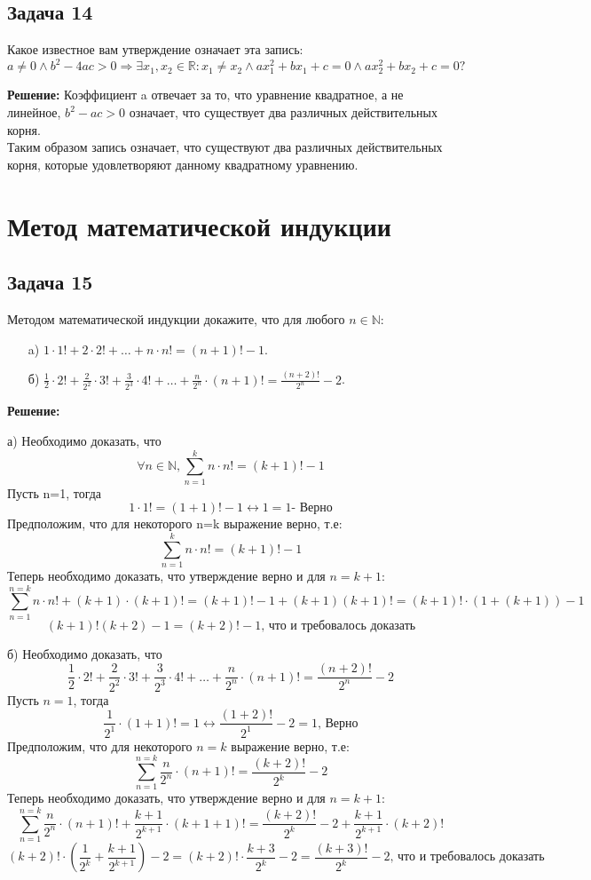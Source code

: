 \documentclass[a4paper,12pt]{article}
\begin{document}
\subsection{Задача 14}
Какое известное вам утверждение означает эта запись:
\[
a \neq 0 \wedge b^2 - 4ac > 0 \Rightarrow \exists x_1, x_2 \in \mathbb{R} : x_1 \neq x_2 \wedge ax_1^2 + bx_1 + c = 0 \wedge ax_2^2 + bx_2 + c = 0?
\]

\textbf{Решение:}
Коэффициент a отвечает за то, что уравнение квадратное, а не линейное, $b^2-ac>0$ означает, что существует два различных действительных корня.\\
Таким образом запись означает, что существуют два различных действительных корня, которые удовлетворяют данному квадратному уравнению.
\vspace{1cm}

\section{Метод математической индукции}

\subsection{Задача 15}
Методом математической индукции докажите, что для любого \(n \in \mathbb{N}\):
\begin{itemize}
    \item[a)] \(1 \cdot 1! + 2 \cdot 2! + \ldots + n \cdot n! = (n+1)! - 1\).
    \item[б)] \(\frac{1}{2} \cdot 2! + \frac{2}{2^2} \cdot 3! + \frac{3}{2^3} \cdot 4! + \ldots + \frac{n}{2^n} \cdot (n+1)! = \frac{(n+2)!}{2^n} - 2\).
\end{itemize}

\textbf{Решение:}
\item[а)] 
Необходимо доказать, что 
\[
\forall n \in \mathbb{N}, \sum_{n=1}^{k}n \cdot n!=(k+1)!-1 
\]
Пусть n=1, тогда
\[
1\cdot 1! = (1+1)!-1 \leftrightarrow 1=1 \text{- Верно}
\]
Предположим, что для некоторого n=k выражение верно, т.е:
\[
\sum_{n=1}^{k}n\cdot n!=(k+1)!-1
\]
Теперь необходимо доказать, что утверждение верно и для $n=k+1$:
\[
\sum_{n=1}^{n=k}n\cdot n! + (k+1)\cdot (k+1)! = (k+1)!-1+(k+1)(k+1)! = (k+1)!\cdot (1+(k+1)) -1
\]
\[
(k+1)!(k+2) - 1 = (k+2)!-1 \text{, что и требовалось доказать}
\]
\item[б)]
Необходимо доказать, что 
\[
\frac{1}{2} \cdot 2! + \frac{2}{2^2} \cdot 3! + \frac{3}{2^3} \cdot 4! + \ldots + \frac{n}{2^n} \cdot (n+1)! = \frac{(n+2)!}{2^n} - 2
\]
Пусть $n=1$, тогда
\[
\frac{1}{2^1}\cdot (1+1)!=1 \leftrightarrow \frac{(1+2)!}{2^1}-2=1 \text{, Верно}
\]
Предположим, что для некоторого $n=k$ выражение верно, т.е:
\[
\sum_{n=1}^{n=k}\frac{n}{2^n}\cdot (n+1)! = \frac{(k+2)!}{2^k}-2
\]
Теперь необходимо доказать, что утверждение верно и для $n=k+1$:
\[
\sum_{n=1}^{n=k}\frac{n}{2^n}\cdot (n+1)! + \frac{k+1}{2^{k+1}}\cdot (k+1+1)!=\frac{(k+2)!}{2^k}-2+\frac{k+1}{2^{k+1}}\cdot (k+2)!
\]
\[
(k+2)!\cdot (\frac{1}{2^k}+\frac{k+1}{2^{k+1}}) - 2 = (k+2)!\cdot \frac{k+3}{2^k}-2 = \frac{(k+3)!}{2^k}-2 \text{, что и требовалось доказать}
\]
\vspace{1cm}
\end{document}
